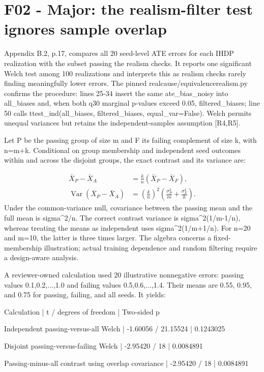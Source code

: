 \documentclass[10pt]{article}
\begin{document}
\section*{F02 - Major: the realism-filter test ignores sample overlap}
Appendix B.2, p.17, compares all 20 seed-level ATE errors for each IHDP realization with the subset passing the realism checks. It reports one significant Welch test among 100 realizations and interprets this as realism checks rarely finding meaningfully lower errors. The pinned realcause/equivalencerealism.py confirms the procedure: lines 25-34 insert the same ate\_bias\_noisy into all\_biases and, when both q30 marginal p-values exceed 0.05, filtered\_biases; line 50 calls ttest\_ind(all\_biases, filtered\_biases, equal\_var=False). Welch permits unequal variances but retains the independent-samples assumption [R4,R5].\par
Let P be the passing group of size m and F its failing complement of size k, with n=m+k. Conditional on group membership and independent seed outcomes within and across the disjoint groups, the exact contrast and its variance are:\par
\[\begin{aligned}\bar X_P-\bar X_A&=\frac{k}{n}(\bar X_P-\bar X_F),\\\operatorname{Var}(\bar X_P-\bar X_A)&=\left(\frac{k}{n}\right)^2\left(\frac{\sigma_P^2}{m}+\frac{\sigma_F^2}{k}\right).\end{aligned}\] Under the common-variance null, covariance between the passing mean and the full mean is sigma\textasciicircum{}2/n. The correct contrast variance is sigma\textasciicircum{}2(1/m-1/n), whereas treating the means as independent uses sigma\textasciicircum{}2(1/m+1/n). For n=20 and m=10, the latter is three times larger. The algebra concerns a fixed-membership illustration; actual training dependence and random filtering require a design-aware analysis.\par
A reviewer-owned calculation used 20 illustrative nonnegative errors: passing values 0.1,0.2,...,1.0 and failing values 0.5,0.6,...,1.4. Their means are 0.55, 0.95, and 0.75 for passing, failing, and all seeds. It yields:\par
Calculation | t / degrees of freedom | Two-sided p\par
Independent passing-versus-all Welch | -1.60056 / 21.15524 | 0.1243025\par
Disjoint passing-versus-failing Welch | -2.95420 / 18 | 0.0084891\par
Passing-minus-all contrast using overlap covariance | -2.95420 / 18 | 0.0084891\par
\end{document}
